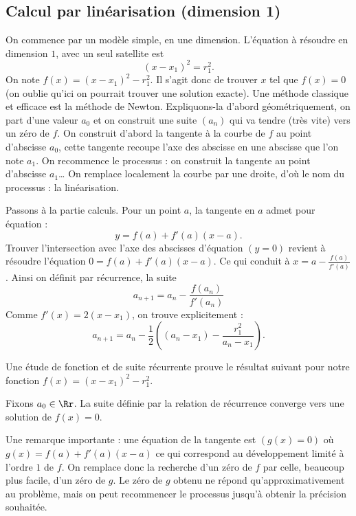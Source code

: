 \documentclass[class=report,crop=false]{standalone}
\begin{document}
\subsection{Calcul par linéarisation (dimension 1)}

On commence par un modèle simple, en une dimension.
L'équation à résoudre en dimension $1$, avec un seul satellite est
$$(x-x_1)^2=r_1^2.$$
On note $f(x) = (x-x_1)^2-r_1^2$.
Il s'agit donc de trouver $x$ tel que $f(x)=0$ (on oublie qu'ici on pourrait trouver une solution exacte).
Une méthode classique et efficace est la méthode de Newton.
Expliquons-la d'abord géométriquement, on part d'une valeur 
$a_0$ et on construit une suite $(a_n)$ qui va tendre
(très vite) vers un zéro de $f$. On construit
d'abord la tangente à la courbe de $f$ au point d'abscisse $a_0$,
cette tangente recoupe l'axe des abscisse en une abscisse que l'on note
$a_1$. On recommence le processus  : on construit la tangente au point d'abscisse $a_1$\ldots
On remplace localement la courbe par une droite,
d'où le nom du processus  : la linéarisation. 



Passons à la partie calculs. Pour un point $a$, la tangente en 
$a$ admet pour équation :
$$y = f(a) + f'(a)(x-a).$$
Trouver l'intersection avec l'axe des abscisses 
d'équation $(y=0)$ revient 
à résoudre l'équation $0 = f(a) + f'(a)(x-a)$.  
Ce qui conduit à $x = a - \frac{f(a)}{f'(a)}$.
Ainsi on définit par récurrence, la suite
\begin{equation}
\label{eq :gpsnewt1}
a_{n+1} = a_n - \frac{f(a_n)}{f'(a_n)}
\end{equation}
Comme $f'(x) = 2(x-x_1)$, on trouve explicitement  :
$$a_{n+1} = a_n - \frac12 \left( (a_n-x_1) - 
\frac{r_1^2}{a_n-x_1} \right).$$

Une étude de fonction et de suite récurrente prouve le résultat suivant
pour notre fonction $f(x) = (x-x_1)^2-r_1^2$.
\begin{proposition}
Fixons $a_0 \in \Rr$. La suite définie par la relation de récurrence
converge vers une solution de $f(x)=0$.
\end{proposition}


Une remarque importante  : une équation de la tangente est $(g(x)=0)$ où
$g(x) = f(a) + f'(a)(x-a)$ ce qui correspond au développement limité à l'ordre $1$ de $f$.
On remplace donc la recherche d'un zéro de $f$ par celle, beaucoup plus facile, 
d'un zéro de $g$. Le zéro de $g$ obtenu ne répond qu'approximativement au problème, mais on
peut recommencer le processus jusqu'à obtenir la précision souhaitée. 
\end{document}
